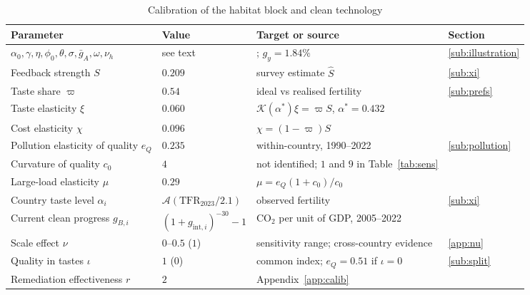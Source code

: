 \documentclass[11pt]{article}
\begin{document}
\begin{table}[h!]\centering
\begin{threeparttable}
\caption{Calibration of the habitat block and clean technology}
\label{tab:recal}
\footnotesize
\begin{tabular}{llll}
\toprule
Parameter & Value & Target or source & Section\\
\midrule
$\alpha_0,\gamma,\eta,\phi_0,\theta,\sigma,\bar g_A,\omega,\nu_h$ & see text & \citet{STRULIK2024104943}; $g_y=1.84\%$ & \ref{sub:illustration}\\
Feedback strength $S$ & $0.209$ & survey estimate $\hat S$ & \ref{sub:xi}\\
Taste share $\varpi$ & $0.54$ & ideal vs realised fertility & \ref{sub:prefs}\\
Taste elasticity $\xi$ & $0.060$ & $\mathcal{K}(\alpha^\ast)\xi=\varpi S$, $\alpha^\ast=0.432$ & \\
Cost elasticity $\chi$ & $0.096$ & $\chi=(1-\varpi)S$ & \\
Pollution elasticity of quality $e_Q$ & $0.235$ & within-country, 1990--2022 & \ref{sub:pollution}\\
Curvature of quality $c_0$ & $4$ & not identified; $1$ and $9$ in Table~\ref{tab:sens} & \\
Large-load elasticity $\mu$ & $0.29$ & $\mu=e_Q(1+c_0)/c_0$ & \\
Country taste level $\alpha_i$ & $\mathcal{A}(\text{TFR}_{2023}/2.1)$ & observed fertility & \ref{sub:xi}\\
Current clean progress $g_{B,i}$ & $(1+g_{\text{int},i})^{-30}-1$ & CO$_2$ per unit of GDP, 2005--2022 & \\
Scale effect $\nu$ & $0$--$0.5$ ($1$) & sensitivity range; cross-country evidence & \ref{app:nu}\\
Quality in tastes $\iota$ & $1$ ($0$) & common index; $e_Q=0.51$ if $\iota=0$ & \ref{sub:split}\\
Remediation effectiveness $r$ & $2$ & Appendix~\ref{app:calib} & \\
\bottomrule
\end{tabular}
\end{threeparttable}
\end{table}
\end{document}

